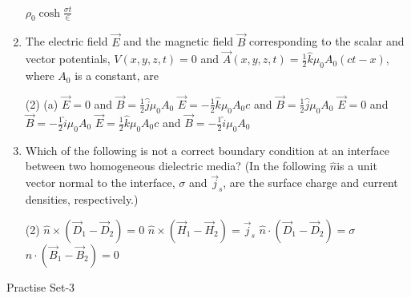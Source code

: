 \begin{enumerate}
\begin{tasks}
		\task[\textbf{D.}] $\rho_{0} \cosh \frac{\sigma t}{\in}$
	\end{tasks}
	\item  The electric field $\vec{E}$ and the magnetic field $\vec{B}$ corresponding to the scalar and vector potentials, $V(x, y, z, t)=0$ and $\vec{A}(x, y, z, t)=\frac{1}{2} \hat{k} \mu_{0} A_{0}(c t-x)$, where $A_{0}$ is a constant, are 
	{}
	\begin{tasks}(2)
		\task[\textbf{A.}] (a) $\vec{E}=0$ and $\vec{B}=\frac{1}{2} \hat{j} \mu_{0} A_{0}$
		\task[\textbf{B.}] $\vec{E}=-\frac{1}{2} \hat{k} \mu_{0} A_{0} c$ and $\vec{B}=\frac{1}{2} \hat{j} \mu_{0} A_{0}$
		\task[\textbf{C.}]  $\vec{E}=0$ and $\vec{B}=-\frac{1}{2} \hat{i} \mu_{0} A_{0}$
		\task[\textbf{D.}] $\vec{E}=\frac{1}{2} \hat{k} \mu_{0} A_{0} c$ and $\vec{B}=-\frac{1}{2} \hat{i} \mu_{0} A_{0}$
	\end{tasks}
	\item Which of the following is not a correct boundary condition at an interface between two homogeneous dielectric media? (In the following $\hat{n}$is a unit vector normal to the  interface, $\sigma$ and $\vec{j}_s$, are the surface charge and current densities, respectively.)
	{}
	\begin{tasks}(2)
		\task[\textbf{A.}] $\hat{n} \times\left(\vec{D}_{1}-\vec{D}_{2}\right)=0$
		\task[\textbf{B.}] $\hat{n} \times\left(\vec{H}_{1}-\vec{H}_{2}\right)=\vec{j}_{s}$
		\task[\textbf{C.}] $\hat{n} \cdot\left(\vec{D}_{1}-\vec{D}_{2}\right)=\sigma$
		\task[\textbf{D.}] $\hat{n} \cdot\left(\vec{B}_{1}-\vec{B}_{2}\right)=0$
	\end{tasks}
\end{enumerate}
\newpage
\begin{abox}
	Practise Set-3
\end{abox}
